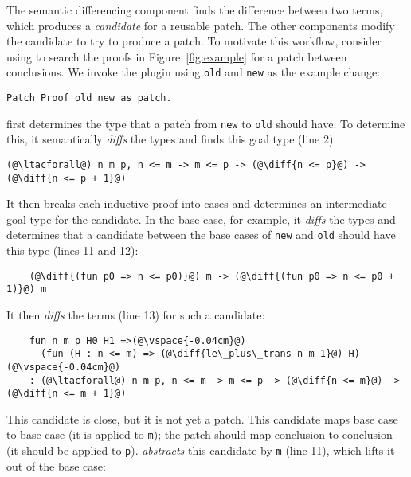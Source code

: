 The semantic differencing component finds the difference between two terms, which produces a \textit{candidate} for
a reusable patch. %
The other components modify the candidate to try to produce a patch.
To motivate this workflow, consider using \sysname to search the proofs in
Figure~\ref{fig:example} for a patch between conclusions. We invoke the plugin using \lstinline{old} and \lstinline{new}
as the example change:

\begin{lstlisting}[language=ml4]
    Patch Proof old new as patch.
\end{lstlisting}

\sysname first determines the type that a patch from \lstinline{new} to \lstinline{old} should have.
To determine this, it semantically \textit{diffs} the types and finds this goal type (line 2):

\begin{lstlisting}[language=coq]
    (@\ltacforall@) n m p, n <= m -> m <= p -> (@\diff{n <= p}@) -> (@\diff{n <= p + 1}@)
\end{lstlisting}

It then breaks each inductive proof into cases and determines an intermediate goal type for the candidate.
In the base case, for example, it \textit{diffs} the types and determines that a candidate
between the base cases of \lstinline{new} and \lstinline{old} should have this type (lines 11 and 12):

\begin{lstlisting}
    (@\diff{(fun p0 => n <= p0)}@) m -> (@\diff{(fun p0 => n <= p0 + 1)}@) m
\end{lstlisting}

It then \textit{diffs} the terms (line 13) for such a candidate:

\begin{lstlisting}
    fun n m p H0 H1 =>(@\vspace{-0.04cm}@)
      (fun (H : n <= m) => (@\diff{le\_plus\_trans n m 1}@) H)(@\vspace{-0.04cm}@)
    : (@\ltacforall@) n m p, n <= m -> m <= p -> (@\diff{n <= m}@) -> (@\diff{n <= m + 1}@)
\end{lstlisting}

This candidate is close, but it is not yet a patch. This candidate
maps base case to base case (it is applied to \lstinline{m}); the patch should map conclusion to conclusion (it should
be applied to \lstinline{p}).
\sysname \textit{abstracts} this candidate by \lstinline{m} (line 11), which lifts it out of the base case:

